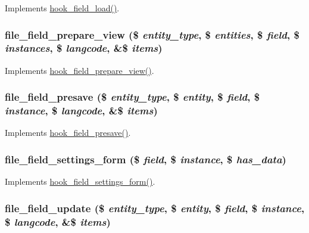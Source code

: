 \label{file_8field_8inc_a003cceddcd9032c60a076b0bfd283cb5}
Implements \hyperlink{group__field__types_ga37f2456e9b5b8b39dc11cffd59163c19}{hook\_\-field\_\-load()}. \hypertarget{file_8field_8inc_a78730e381ae185f44420da98c5b530de}{
\subsubsection[{file\_\-field\_\-prepare\_\-view}]{\setlength{\rightskip}{0pt plus 5cm}file\_\-field\_\-prepare\_\-view (\$ {\em entity\_\-type}, \/  \$ {\em entities}, \/  \$ {\em field}, \/  \$ {\em instances}, \/  \$ {\em langcode}, \/  \&\$ {\em items})}}
\label{file_8field_8inc_a78730e381ae185f44420da98c5b530de}
Implements \hyperlink{group__field__types_ga02a3004a67ecba2b81eaa63b05d08cc8}{hook\_\-field\_\-prepare\_\-view()}. \hypertarget{file_8field_8inc_ad4ad3922256c92b72c48126e4a3794e9}{
\subsubsection[{file\_\-field\_\-presave}]{\setlength{\rightskip}{0pt plus 5cm}file\_\-field\_\-presave (\$ {\em entity\_\-type}, \/  \$ {\em entity}, \/  \$ {\em field}, \/  \$ {\em instance}, \/  \$ {\em langcode}, \/  \&\$ {\em items})}}
\label{file_8field_8inc_ad4ad3922256c92b72c48126e4a3794e9}
Implements \hyperlink{group__field__types_ga5ab3a9e3c8ebccb8ca151790ec07809d}{hook\_\-field\_\-presave()}. \hypertarget{file_8field_8inc_a2915708649a20075b3176a21758b7221}{
\subsubsection[{file\_\-field\_\-settings\_\-form}]{\setlength{\rightskip}{0pt plus 5cm}file\_\-field\_\-settings\_\-form (\$ {\em field}, \/  \$ {\em instance}, \/  \$ {\em has\_\-data})}}
\label{file_8field_8inc_a2915708649a20075b3176a21758b7221}
Implements \hyperlink{group__field__types_gab8a2ed808857cc6f3cb661fbc99d30d4}{hook\_\-field\_\-settings\_\-form()}. \hypertarget{file_8field_8inc_a3666017c649e6c46c6582d871355da2d}{
\subsubsection[{file\_\-field\_\-update}]{\setlength{\rightskip}{0pt plus 5cm}file\_\-field\_\-update (\$ {\em entity\_\-type}, \/  \$ {\em entity}, \/  \$ {\em field}, \/  \$ {\em instance}, \/  \$ {\em langcode}, \/  \&\$ {\em items})}}
